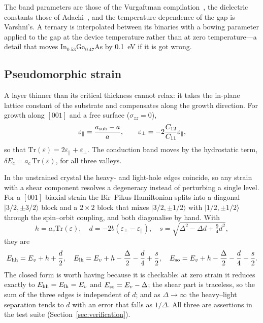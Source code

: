 \documentclass[preprint,12pt]{elsarticle}
\begin{document}
The band parameters are those of the Vurgaftman
compilation~\cite{Vurgaftman2001}, the dielectric constants those of
Adachi~\cite{Adachi2005}, and the temperature dependence of the gap is
Varshni's. A ternary is interpolated between its binaries with a bowing
parameter applied to the gap at the device temperature rather than at zero
temperature---a detail that moves In$_{0.53}$Ga$_{0.47}$As by
\SI{0.1}{eV} if it is got wrong.

\subsection{Pseudomorphic strain}
\label{sec:strain}

A layer thinner than its critical thickness cannot relax: it takes the in-plane
lattice constant of the substrate and compensates along the growth direction.
For growth along $[001]$ and a free surface ($\sigma_{zz}=0$),
\begin{equation}
  \varepsilon_\parallel = \frac{a_{\rm sub}-a}{a}, \qquad
  \varepsilon_\perp = -2\frac{C_{12}}{C_{11}}\varepsilon_\parallel,
  \label{eq:strain}
\end{equation}
so that $\mathrm{Tr}(\varepsilon)=2\varepsilon_\parallel+\varepsilon_\perp$.
The conduction band moves by the hydrostatic term, $\delta E_c =
a_c\,\mathrm{Tr}(\varepsilon)$, for all three valleys.

In the unstrained crystal the heavy- and light-hole edges coincide, so any
strain with a shear component resolves a degeneracy instead of perturbing a
single level. For a $[001]$ biaxial strain the Bir--Pikus Hamiltonian splits
into a diagonal $|3/2,\pm3/2\rangle$ block and a $2\times2$ block that mixes
$|3/2,\pm1/2\rangle$ with $|1/2,\pm1/2\rangle$ through the spin--orbit
coupling, and both diagonalise by hand. With
\begin{equation}
  h = a_v\mathrm{Tr}(\varepsilon), \quad
  d = -2b(\varepsilon_\perp-\varepsilon_\parallel), \quad
  s = \sqrt{\Delta^2-\Delta d+\tfrac{9}{4}d^2},
  \label{eq:bp}
\end{equation}
they are
\begin{equation}
  E_{\rm hh} = E_v + h + \frac{d}{2},\quad
  E_{\rm lh} = E_v + h - \frac{\Delta}{2} - \frac{d}{4} + \frac{s}{2},\quad
  E_{\rm so} = E_v + h - \frac{\Delta}{2} - \frac{d}{4} - \frac{s}{2}.
  \label{eq:edges}
\end{equation}
The closed form is worth having because it is checkable: at zero strain it reduces exactly to
$E_{\rm hh}=E_{\rm lh}=E_v$ and $E_{\rm so}=E_v-\Delta$; the shear part is
traceless, so the sum of the three edges is independent of $d$; and as
$\Delta\to\infty$ the heavy--light separation tends to $d$ with an error that
falls as $1/\Delta$. All three are assertions in the test suite
(Section~\ref{sec:verification}).
\end{document}
